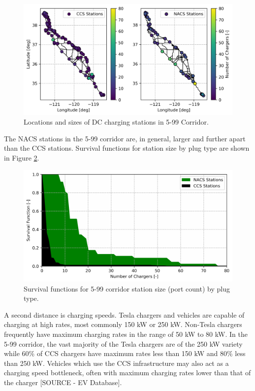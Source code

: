 \begin{figure}[H]
	\centering
	\includegraphics[width = .67\linewidth]{./figures/stations_corridor.png}
	\caption{Locations and sizes of DC charging stations in 5-99 Corridor.}
	\label{fig:stations_corridor}
\end{figure}

The NACS stations in the 5-99 corridor are, in general, larger and further apart than the CCS stations. Survival functions for station size by plug type are shown in Figure \ref{fig:stations_survival}.

\begin{figure}[H]
	\centering
	\includegraphics[width = .67\linewidth]{./figures/stations_survival.png}
	\caption{Survival functions for 5-99 corridor station size (port count) by plug type.}
	\label{fig:stations_survival}
\end{figure}

A second distance is charging speeds. Tesla chargers and vehicles are capable of charging at high rates, most commonly 150 kW or 250 kW. Non-Tesla chargers frequently have maximum charging rates in the range of 50 kW to 80 kW. In the 5-99 corridor, the vast majority of the Tesla chargers are of the 250 kW variety while 60\% of CCS chargers have maximum rates less than 150 kW and 80\% less than 250 kW. Vehicles which use the CCS infrastructure may also act as a charging speed bottleneck, often with maximum charging rates lower than that of the charger [SOURCE - EV Database].

